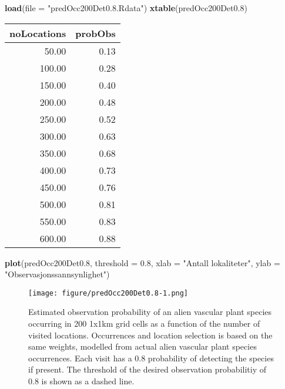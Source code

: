 \documentclass[]{article}
\newenvironment{Shaded}{\begin{snugshade}}{\end{snugshade}}
\newcommand{\KeywordTok}[1]{\textcolor[rgb]{0.13,0.29,0.53}{\textbf{#1}}}
\newcommand{\DataTypeTok}[1]{\textcolor[rgb]{0.13,0.29,0.53}{#1}}
\newcommand{\DecValTok}[1]{\textcolor[rgb]{0.00,0.00,0.81}{#1}}
\newcommand{\FloatTok}[1]{\textcolor[rgb]{0.00,0.00,0.81}{#1}}
\newcommand{\StringTok}[1]{\textcolor[rgb]{0.31,0.60,0.02}{#1}}
\newcommand{\NormalTok}[1]{#1}
\begin{document}
\begin{Shaded}
\begin{Highlighting}[]
\KeywordTok{load}\NormalTok{(}\DataTypeTok{file =} \StringTok{"predOcc200Det0.8.Rdata"}\NormalTok{)}
\KeywordTok{xtable}\NormalTok{(predOcc200Det0.}\DecValTok{8}\NormalTok{)}
\end{Highlighting}
\end{Shaded}

\begin{table}[ht]
\centering
\begin{tabular}{rr}
  \hline
noLocations & probObs \\ 
  \hline
50.00 & 0.13 \\ 
  100.00 & 0.28 \\ 
  150.00 & 0.40 \\ 
  200.00 & 0.48 \\ 
  250.00 & 0.52 \\ 
  300.00 & 0.63 \\ 
  350.00 & 0.68 \\ 
  400.00 & 0.73 \\ 
  450.00 & 0.76 \\ 
  500.00 & 0.81 \\ 
  550.00 & 0.83 \\ 
  600.00 & 0.88 \\ 
   \hline
\end{tabular}
\end{table}

\begin{Shaded}
\begin{Highlighting}[]
\KeywordTok{plot}\NormalTok{(predOcc200Det0.}\DecValTok{8}\NormalTok{, }\DataTypeTok{threshold =} \FloatTok{0.8}\NormalTok{, }\DataTypeTok{xlab =} \StringTok{"Antall lokaliteter"}\NormalTok{, }\DataTypeTok{ylab =} \StringTok{"Observasjonssannsynlighet"}\NormalTok{)}
\end{Highlighting}
\end{Shaded}

\begin{figure}
\centering
\texttt{[image: figure/predOcc200Det0.8-1.png]}
\caption{Estimated observation probability of an alien vascular plant
species occurring in 200 1x1km grid cells as a function of the number of
visited locations. Occurrences and location selection is based on the
same weights, modelled from actual alien vascular plant species
occurrences. Each visit has a 0.8 probability of detecting the species
if present. The threshold of the desired observation probabilitiy of 0.8
is shown as a dashed line. \label{predOcc200Det0.8}}
\end{figure}
\end{document}
